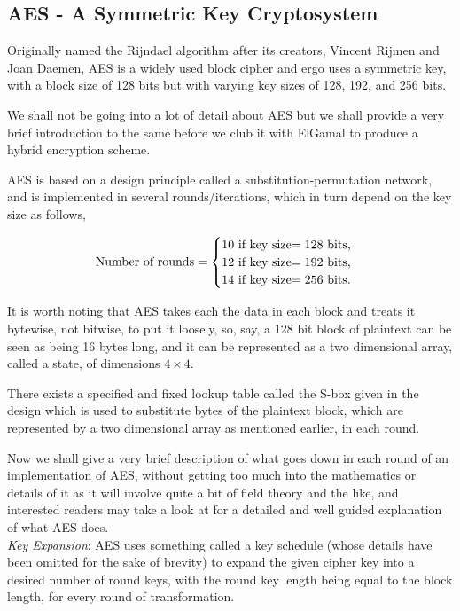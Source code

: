 \subsection{AES - A Symmetric Key Cryptosystem}

Originally named the Rijndael algorithm after its creators, Vincent Rijmen and Joan Daemen, AES is a widely used block cipher and ergo uses a symmetric key, with a block size of 128 bits but with varying key sizes of 128, 192, and 256 bits.

We shall not be going into a lot of detail about AES but we shall provide a very brief introduction to the same before we club it with ElGamal to produce a hybrid encryption scheme.

AES is based on a design principle called a substitution-permutation network, and is implemented in several rounds/iterations, which in turn depend on the key size as follows,

\begin{align*}
    \text{Number of rounds}=\begin{cases}
    10 \text{ if key size$ = 128$ bits,}\\
    12 \text{ if key size$ = 192$ bits,}\\
    14 \text{ if key size$ = 256$ bits.}
    \end{cases}
\end{align*}

It is worth noting that AES takes each the data in each block and treats it bytewise, not bitwise, to put it loosely, so, say, a 128 bit block of plaintext can be seen as being 16 bytes long, and it can be represented as a two dimensional array, called a state, of dimensions $4\times4$.

There exists a specified and fixed lookup table called the S-box given in the design which is used to substitute bytes of the plaintext block, which are represented by a two dimensional array as mentioned earlier, in each round.

Now we shall give a very brief description of what goes down in each round of an implementation of AES, without getting too much into the mathematics or details of it as it will involve quite a bit of field theory and the like, and interested readers may take a look at \cite{RijndaelProp} for a detailed and well guided explanation of what AES does.\\

\emph{Key Expansion}: AES uses something called a key schedule (whose details have been omitted for the sake of brevity) to expand the given cipher key into a desired number of round keys, with the round key length being equal to the block length, for every round of transformation.

